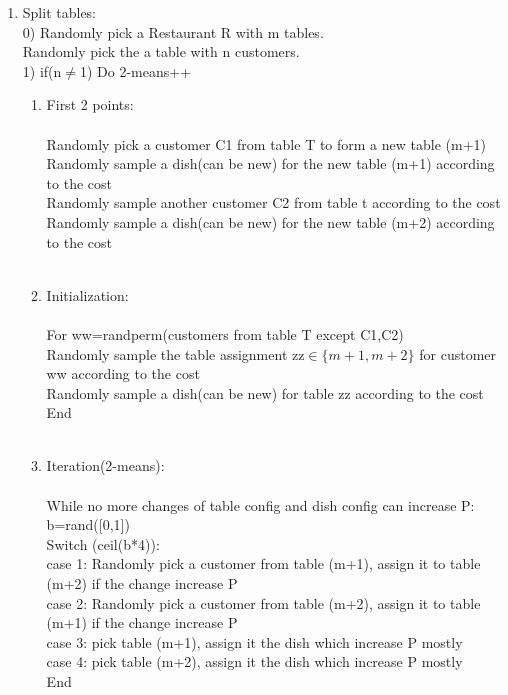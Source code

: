\documentclass{article}
\begin{document}
\begin{enumerate}
\item Split tables:\\
0) Randomly pick a Restaurant R with m tables.\\
   Randomly pick the a table with n customers.\\ 
1) if(n$\neq$1) Do 2-means++ 
\begin{enumerate}
\item First 2 points:\\ \\
Randomly pick a customer C1 from table T to form a new table (m+1)\\
Randomly sample a dish(can be new) for the new table (m+1) according to the cost\\
Randomly sample another customer C2 from table t according to the cost\\
Randomly sample a dish(can be new) for the new table (m+2) according to the cost\\ \\
\item Initialization:\\ \\
For ww=randperm(customers from table T except C1,C2) \\ 
Randomly sample the table assignment zz$\in \{m+1,m+2\}$ for customer ww according to the cost\\
Randomly sample a dish(can be new) for table zz according to the cost\\
End \\ \\
\item Iteration(2-means):\\ \\
While no more changes of table config and dish config can increase P:\\
b=rand([0,1]) \\
Switch (ceil(b*4)):\\
case 1: Randomly pick a customer from table (m+1), assign it to table (m+2) if the change increase P\\
case 2: Randomly pick a customer from table (m+2), assign it to table (m+1) if the change increase P\\
case 3: pick table (m+1), assign it the dish which increase P mostly\\
case 4: pick table (m+2), assign it the dish which increase P mostly\\
End\\
\end{enumerate}  


\end{enumerate}
\end{document}
